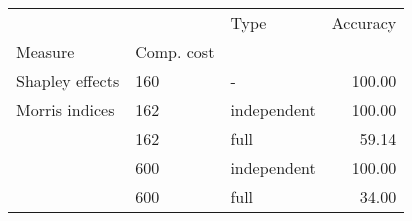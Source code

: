 \begin{tabular}{lllr}
\toprule
               &     &         Type &  Accuracy \\
Measure & Comp. cost &              &           \\
\midrule
Shapley effects & 160 &            - &    100.00 \\
Morris indices & 162 &  independent &    100.00 \\
               & 162 &         full &     59.14 \\
               & 600 &  independent &    100.00 \\
               & 600 &         full &     34.00 \\
\bottomrule
\end{tabular}
